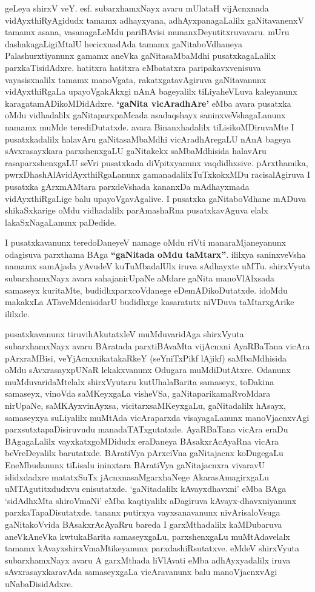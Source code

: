 geLeya shirxV veY. esf. subarxhamxNayx avaru mUlataH vijAcnxnada vidAyxthiRyAgidudx tamamx adhayxyana, adhAyxpanagaLalilx gaNitavanenxV tamamx asana, vasanagaLeMdu pariBAvisi munanxDeyutitxruvavaru. mUru dashakagaLigiMtalU hecicxnadAda tamamx gaNitaboVdhaneya Palashurxtiyanunx gamamx aneVka gaNitasaMbaMdhi pusatxkagaLalilx parxkaTisidAdxre. hatitxra hatitxra eMbatatxra paripakavxvenisuva vayasisxnalilx tamamx manoVgata, rakatxgatavAgiruva gaNitavanunx vidAyxthiRgaLa upayoVgakAkxgi nAnA bageyalilx tiLiyaheVLuva kaleyanunx karagatamADikoMDidAdxre. {\bf `gaNita vicAradhAre'} eMba avara pusatxka oMdu vidhadalilx gaNitaparxpaMcada asadaqshayx saninxveVshagaLanunx namamx muMde terediDutatxde. avara Binanxhadalilx tiLisikoMDiruvaMte I pusatxkadalilx halavAru gaNitasaMbaMdhi vicAradhAregaLU nAnA bageya sAvxrasayxkara parxshenxgaLU gaNitakekx saMbaMdhisida halavAru rasaparxshenxgaLU seVri pusatxkada diVpitxyanunx vaqdidhxsive. pArxthamika, pwrxDhashAlAvidAyxthiRgaLanunx gamanadalilxTuTxkokxMDu racisalAgiruva I pusatxka gArxmAMtara parxdeVshada kananxDa mAdhayxmada vidAyxthiRgaLige balu upayoVgavAgalive. I pusatxka gaNitaboVdhane mADuva shikaSxkarige oMdu vidhadalilx parAmashaRna pusatxkavAguva elalx lakaSxNagaLanunx paDedide.

\bigskip

I pusatxkavanunx teredoDaneyeV namage oMdu riVti manaraMjaneyanunx odagisuva parxthama BAga {\bf ``gaNitada oMdu taMtarx''}. ililxya saninxveVsha namamx samAjada yAvudeV kuTuMbadalUlx iruva sAdhayxte uMTu. shirxVyuta subarxhamxNayx avara sahajanirUpaNe aMdare gaNita manoVlAlxsada samaseyx kuritaMte, budidhxparxcoVdanege eDemADikoDutatxde. idoMdu makakxLa ATaveMdenisidarU budidhxge kasaratutx niVDuva taMtarxgArike ililxde.

\bigskip

pusatxkavanunx tiruvihAkutatxleV muMduvaridAga shirxVyuta subarxhamxNayx avaru BAratada parxtiBAvaMta vijAcnxni AyaRBaTana vicAra pArxraMBisi, veYjAcnxnikatakaRkeY (seYniTxPikf lAjikf) saMbaMdhisida oMdu sAvxrasayxpUNaR lekakxvanunx Odugara muMdiDutAtxre. Odanunx muMduvaridaMtelalx shirxVyutaru kutUhalaBarita samaseyx, toDakina samaseyx, vinoVda saMKeyxgaLa visheVSa, gaNitaparikamaRvoMdara nirUpaNe, saMKAyxvinAyxsa, vicitarxsaMKeyxgaLu, gaNitadalilx hAsayx, samaseyxya suLiyalilx muMtAda vicAraparxda visayagaLanunx manoVjacnxvAgi parxsutxtapaDisiruvudu manadaTATxgutatxde. AyaRBaTana vicAra eraDu BAgagaLalilx vayxkatxgoMDidudx eraDaneya BAsakxrAcAyaRna vicAra beVreDeyalilx barutatxde. BAratiVya pArxciVna gaNitajacnx koDugegaLu EneMbudanunx tiLisalu ininxtara BAratiVya gaNitajacnxra vivaravU ididxdadxre matatxSuTx jAcnxnasaMgarxhaNege AkarasAmagirxgaLu uMTAgutitxdudxvu enisutatxde. `gaNitadalilx kAvayxdhavxni' eMba BAga `sidAdhxMta shiroVmaNi' eMba kaqtiyalilx aDagiruva kAvayx-dhavxniyanunx parxkaTapaDisutatxde. tananx putirxya vayxsanavanunx nivArisaloVsuga gaNitakoVvida BAsakxrAcAyaRru bareda I garxMthadalilx kaMDubaruva aneVkAneVka kwtukaBarita samaseyxgaLu, parxshenxgaLu muMtAdavelalx tamamx kAvayxshirxVmaMtikeyanunx parxdashiRsutatxve. eMdeV shirxVyuta subarxhamxNayx avaru A garxMthada liVlAvati eMba adhAyxyadalilx iruva sAvxrasayxkaravAda samaseyxgaLa vicAravanunx balu manoVjacnxvAgi uNabaDisidAdxre.

